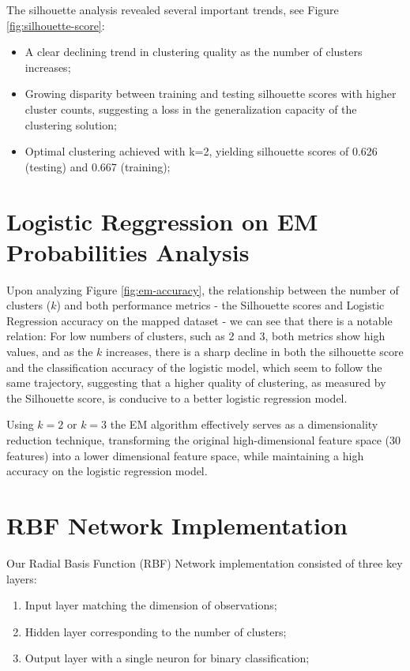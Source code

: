 \documentclass[11pt]{article}
\begin{document}
The silhouette analysis revealed several important trends, see Figure \ref{fig:silhouette-score}:
\begin{itemize}
  \setlength{\itemsep}{0pt}
    \item A clear declining trend in clustering quality as the number of clusters increases;
    \item Growing disparity between training and testing silhouette scores with
    higher cluster counts, suggesting a loss in the generalization capacity of
    the clustering solution;
    \item Optimal clustering achieved with k=2, yielding silhouette scores of 0.626 (testing) and 0.667 (training);
\end{itemize}

\setcounter{section}{3}

\section{Logistic Reggression on EM Probabilities Analysis}

Upon analyzing Figure \ref{fig:em-accuracy}, the relationship between the number of clusters 
($k$) and both performance metrics - the Silhouette scores and
Logistic Regression accuracy on the mapped dataset - we can see
that there is a notable relation: For low numbers of clusters,
such as 2 and 3, both metrics show high values, and as the $k$
increases, there is a sharp decline in both the silhouette score
and the classification accuracy of the logistic model, which
seem to follow the same trajectory, suggesting that a higher
quality of clustering, as measured by the Silhouette score, is
conducive to a better logistic regression model.

Using $k=2$ or $k=3$ the EM algorithm effectively serves as a
dimensionality reduction technique, transforming the original
high-dimensional feature space (30 features) into a lower
dimensional feature space, while maintaining a high accuracy
on the logistic regression model.

\section{RBF Network Implementation}

Our Radial Basis Function (RBF) Network implementation consisted of three key layers:

\begin{enumerate}
    \item Input layer matching the dimension of observations;
    \item Hidden layer corresponding to the number of clusters;
    \item Output layer with a single neuron for binary classification;
\end{enumerate}
\end{document}

